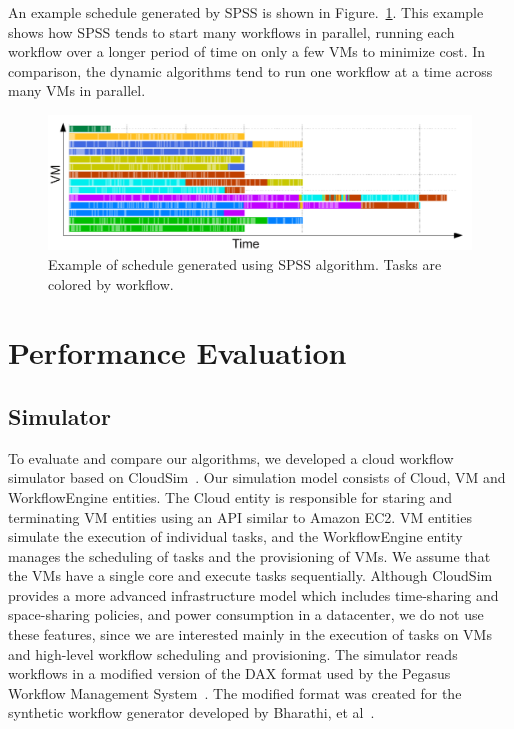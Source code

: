 \documentclass{sig-alternate}
\begin{document}
An example schedule generated by SPSS is shown in Figure.~\ref{fig:spss-example}.
This example shows how SPSS tends to start many workflows in parallel, running
each workflow over a longer period of time on only a few VMs to minimize cost. 
In comparison, the dynamic algorithms tend to run one workflow at a time across 
many VMs in parallel.

\begin{figure}[tb] 
\centering
\includegraphics[width=1.0\columnwidth]{figures/spss-gantt}
 \caption{Example of schedule generated using SPSS algorithm. Tasks are colored by workflow. }
\label{fig:spss-example}
\end{figure}



\section{Performance Evaluation}
\label{sec:performance}



\subsection{Simulator}

To evaluate and compare our algorithms, we developed a cloud workflow simulator based on
CloudSim~\cite{Calheiros11}. Our simulation model consists of Cloud, VM and WorkflowEngine 
entities. The Cloud entity is responsible for staring and terminating VM entities using 
an API similar to Amazon EC2. VM entities simulate the execution of individual tasks,
and the WorkflowEngine entity manages the scheduling of tasks and the provisioning of
VMs. We assume that the VMs have a single core and execute tasks sequentially. Although 
CloudSim provides a more advanced infrastructure model which includes time-sharing and 
space-sharing policies, and power consumption in a datacenter, we do not use these 
features, since we are interested mainly in the execution of tasks on VMs and high-level 
workflow scheduling and provisioning. The simulator reads workflows in a modified version of
the DAX format used by the Pegasus Workflow Management System~\cite{Deelman2005}. The modified format was
created for the synthetic workflow generator developed by Bharathi, et al~\cite{Bharathi08}.
\end{document}
